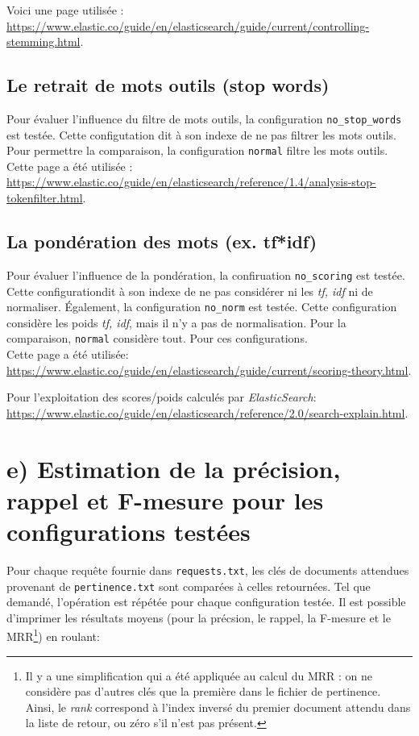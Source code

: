 \documentclass[12pt]{article}
\begin{document}
Voici une page utilisée : \url{https://www.elastic.co/guide/en/elasticsearch/guide/current/controlling-stemming.html}.

\subsection{Le retrait de mots outils (stop words)}
Pour évaluer l'influence du filtre de mots outils, la configuration \verb;no_stop_words; est testée. Cette configutation dit à son indexe de ne pas filtrer les mots outils. Pour permettre la comparaison, la configuration \verb;normal; filtre les mots outils.\\

Cette page a été utilisée : \url{https://www.elastic.co/guide/en/elasticsearch/reference/1.4/analysis-stop-tokenfilter.html}.

\subsection{La pondération des mots (ex. tf*idf)}
Pour évaluer l'influence de la pondération, la confiruation \verb;no_scoring; est testée. Cette configurationdit à son indexe de ne pas considérer ni les \textit{tf, idf} ni de normaliser. Également, la configuration \verb;no_norm; est testée. Cette configuration considère les poids \textit{tf, idf}, mais il n'y a pas de normalisation. Pour la comparaison, \verb;normal; considère tout. Pour ces configurations.\\

Cette page a été utilisée: \url{https://www.elastic.co/guide/en/elasticsearch/guide/current/scoring-theory.html}.

Pour l'exploitation des scores/poids calculés par \textit{ElasticSearch}: \url{https://www.elastic.co/guide/en/elasticsearch/reference/2.0/search-explain.html}.

\section{e) Estimation de la précision, rappel et F-mesure pour les configurations testées}

Pour chaque requête fournie dans \verb;requests.txt;, les clés de documents attendues provenant de \verb;pertinence.txt; sont comparées à celles retournées. Tel que demandé, l'opération est répétée pour chaque configuration testée. Il est possible d'imprimer les résultats moyens (pour la précsion, le rappel, la F-mesure et le MRR\footnote{Il y a une simplification qui a été appliquée au calcul du MRR : on ne considère pas d'autres clés que la première dans le fichier de pertinence. Ainsi, le \textit{rank} correspond à l'index inversé du premier document attendu dans la liste de retour, ou zéro s'il n'est pas présent.}) en roulant:
\end{document}
